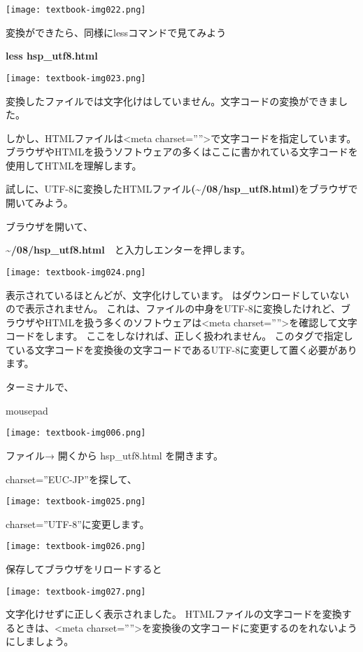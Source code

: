 \begin{center}
  \texttt{[image: textbook-img022.png]}
\end{center}

\clearpage
変換ができたら、同様にlessコマンドで見てみよう

\textbf{less hsp\_utf8.html}

\begin{center}
    \texttt{[image: textbook-img023.png]}
\end{center}
変換したファイルでは文字化けはしていません。文字コードの変換ができました。

\clearpage
しかし、HTMLファイルは{\textless}meta charset=””{\textgreater}で文字コードを指定しています。
ブラウザやHTMLを扱うソフトウェアの多くはここに書かれている文字コードを使用してHTMLを理解します。

試しに、UTF-8に変換したHTMLファイル\textbf{({\textasciitilde}/08/hsp\_utf8.html)}をブラウザで開いてみよう。

ブラウザを開いて、

\textbf{{\textasciitilde}/08/hsp\_utf8.html}　と入力しエンターを押します。

\begin{center}
  \texttt{[image: textbook-img024.png]}
\end{center}
表示されているほとんどが、文字化けしています。
はダウンロードしていないので表示されません。
これは、ファイルの中身をUTF-8に変換したけれど、ブラウザやHTMLを扱う多くのソフトウェアは{\textless}meta charset=””{\textgreater}を確認して文字コードをします。
ここをしなければ、正しく扱われません。
このタグで指定している文字コードを変換後の文字コードであるUTF-8に変更して置く必要があります。

\clearpage

ターミナルで、

mousepad

\begin{center}
  \texttt{[image: textbook-img006.png]}
\end{center}

ファイル→ 開くから hsp\_utf8.html を開きます。

charset=”EUC-JP”を探して、
\begin{center}
  \texttt{[image: textbook-img025.png]}
\end{center}
charset=”UTF-8”に変更します。
\begin{center}
  \texttt{[image: textbook-img026.png]}
\end{center}

\clearpage
保存してブラウザをリロードすると
\begin{center}
  \texttt{[image: textbook-img027.png]}
\end{center}

文字化けせずに正しく表示されました。
HTMLファイルの文字コードを変換するときは、{\textless}meta charset=””{\textgreater}を変換後の文字コードに変更するのをれないようにしましょう。
